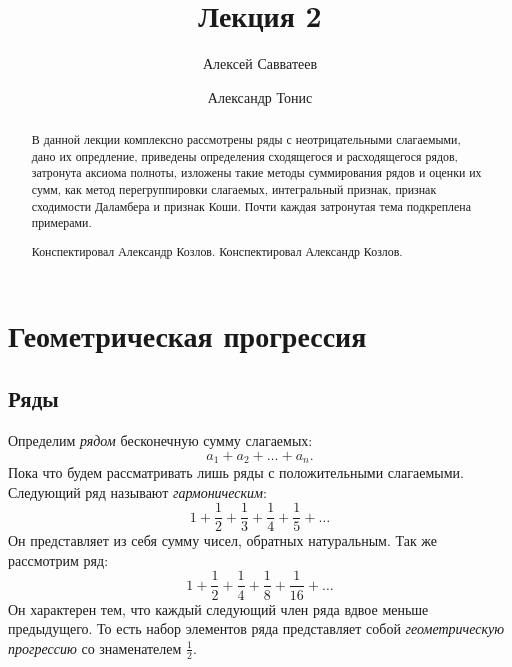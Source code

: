\documentclass[12pt]{article}
\title{Лекция 2}
\author{Алексей Савватеев \and Александр Тонис}
\begin{document}
\maketitle
\begin{abstract}
В данной лекции комплексно рассмотрены ряды с неотрицательными слагаемыми, дано их опредление, приведены определения сходящегося и расходящегося рядов, затронута аксиома полноты, изложены такие методы суммирования рядов и оценки их сумм, как метод перегруппировки слагаемых, интегральный признак, признак сходимости Даламбера и признак Коши. Почти каждая затронутая тема подкреплена примерами.
\par
Конспектировал Александр Козлов. 
Конспектировал Александр Козлов. 
\end{abstract}
\tableofcontents
\newpage
\section{Геометрическая прогрессия}
\subsection{Ряды}
Определим \emph{рядом} бесконечную сумму слагаемых:
\begin{equation}
    a_1 + a_2 + \ldots + a_n.
\end{equation}
Пока что будем рассматривать лишь ряды с положительными слагаемыми. Следующий ряд называют \emph{гармоническим}:
\begin{equation}\label{eq:1}
    1 + \dfrac{1}{2} + \dfrac13 + \dfrac14 + \dfrac15 + \ldots
\end{equation}
Он представляет из себя сумму чисел, обратных натуральным. Так же рассмотрим ряд:
\begin{equation}\label{eq:2}
    1 + \dfrac{1}{2} + \dfrac14 + \dfrac18 + \dfrac{1}{16} + \ldots
\end{equation}
Он характерен тем, что каждый следующий член ряда вдвое меньше предыдущего. То есть набор элементов ряда представляет собой \emph{геометрическую прогрессию} со знаменателем $\tfrac12$.
\end{document}
